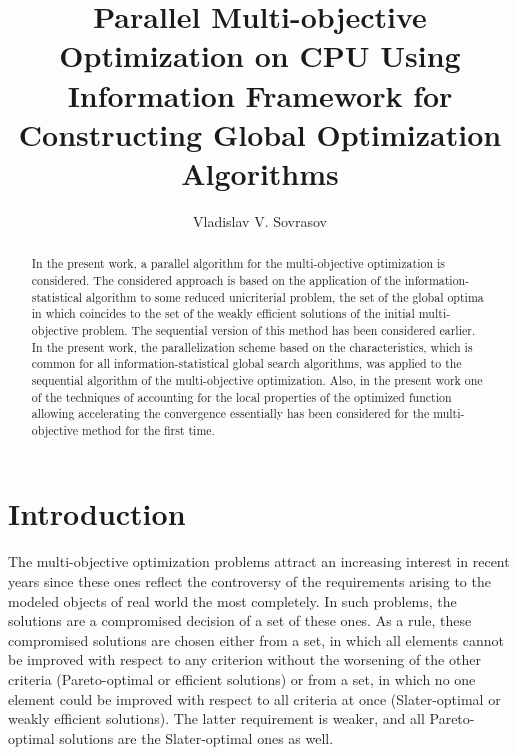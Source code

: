 \documentclass{llncs}
\begin{document}
%
\mainmatter              %
%
\title{Parallel Multi-objective Optimization on CPU Using Information Framework for
Constructing Global Optimization Algorithms}
%
%
\author{Vladislav V. Sovrasov}
%
%
%

\maketitle              %

\begin{abstract}
In the present work, a parallel algorithm for the multi-objective optimization is considered. The
considered approach is based on the application of the information-statistical algorithm to some
reduced unicriterial problem, the set of the global optima in which coincides to the set of the
weakly efficient solutions of the initial multi-objective problem. The sequential version of this
method has been considered earlier. In the present work, the parallelization scheme based on
the characteristics, which is common for all information-statistical global search algorithms,
was applied to the sequential algorithm of the multi-objective optimization. Also, in the present
work one of the techniques of accounting for the local properties of the optimized function
allowing accelerating the convergence essentially has been considered for the multi-objective
method for the first time.

\end{abstract}
%
\section{Introduction}
The multi-objective optimization problems attract an increasing interest in recent years since
these ones reflect the controversy of the requirements arising to the modeled objects of real
world the most completely. In such problems, the solutions are a compromised decision of a set
of these ones. As a rule, these compromised solutions are chosen either from a set, in which all
elements cannot be improved with respect to any criterion without the worsening of the other
criteria (Pareto-optimal or efficient solutions) or from a set, in which no one element could be
improved with respect to all criteria at once (Slater-optimal or weakly efficient solutions). The
latter requirement is weaker, and all Pareto-optimal solutions are the Slater-optimal ones as
well.
\end{document}
